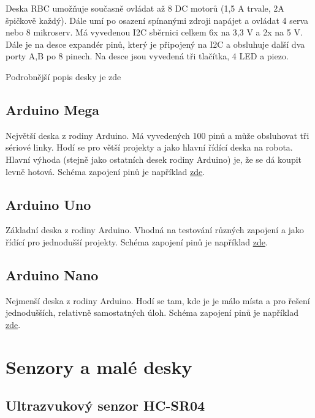Deska RBC umožňuje současně ovládat až 8 DC motorů (1,5 A trvale, 2A špičkově každý). 
Dále umí po osazení spínanými zdroji napájet a ovládat 4 serva nebo 8 mikroserv. 
Má vyvedenou I2C sběrnici celkem 6x na 3,3 V a 2x na 5 V. 
Dále je na desce expandér pinů, který je připojený na I2C a obsluhuje další dva porty A,B po 8 pinech. 
Na desce jsou vyvedená tři tlačítka, 4 LED a piezo.

Podrobnější popis desky je zde %

\subsection{Arduino Mega}

Největší deska z rodiny Arduino. Má vyvedených 100 pinů a může obsluhovat tři sériové linky. 
Hodí se pro větší projekty a jako hlavní řídící deska na robota. 
Hlavní výhoda (stejně jako ostatních desek rodiny Arduino) je, že se dá koupit levně hotová.
Schéma zapojení pinů je například \href{https://arduino-info.wikispaces.com/MegaQuickRef}{zde}.

\subsection{Arduino Uno}

Základní deska z rodiny Arduino. Vhodná na testování různých zapojení a jako řídící pro jednodušší projekty.
Schéma zapojení pinů je například \href{http://forum.arduino.cc/index.php?topic=146315.0}{zde}.

\subsection{Arduino Nano}

Nejmenší deska z rodiny Arduino. 
Hodí se tam, kde je je málo místa a pro řešení jednodušších, relativně samostatných úloh. 
Schéma zapojení pinů je například \href{https://simba-os.readthedocs.io/en/latest/_images/arduino-nano-pinout.png}{zde}.

\section{Senzory a malé desky}

\label{hcsr04} \subsection{Ultrazvukový senzor HC-SR04} 

